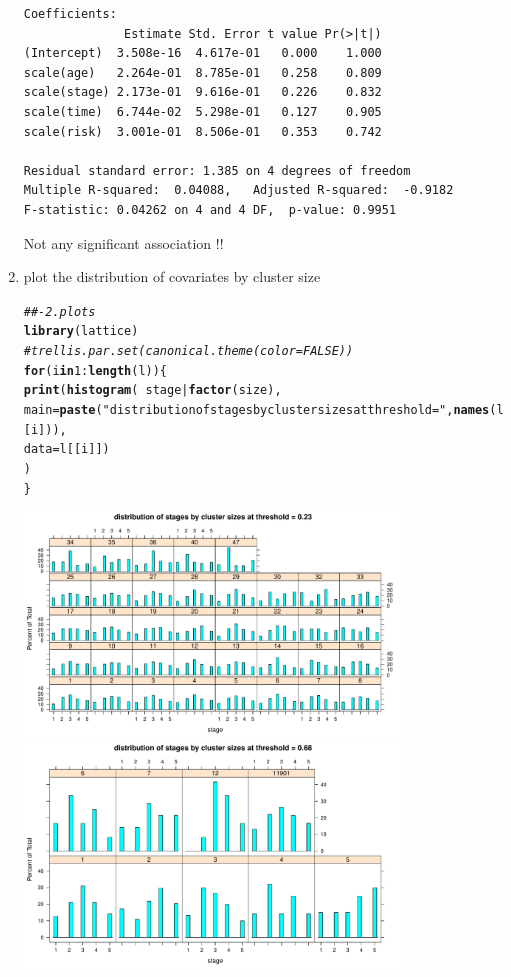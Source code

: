 \documentclass[]{revtex4}\usepackage[]{graphicx}\usepackage[]{color}
\makeatletter
\newcommand{\hlnum}[1]{\textcolor[rgb]{0.686,0.059,0.569}{#1}}%
\newcommand{\hlstr}[1]{\textcolor[rgb]{0.192,0.494,0.8}{#1}}%
\newcommand{\hlcom}[1]{\textcolor[rgb]{0.678,0.584,0.686}{\textit{#1}}}%
\newcommand{\hlopt}[1]{\textcolor[rgb]{0,0,0}{#1}}%
\newcommand{\hlstd}[1]{\textcolor[rgb]{0.345,0.345,0.345}{#1}}%
\newcommand{\hlkwa}[1]{\textcolor[rgb]{0.161,0.373,0.58}{\textbf{#1}}}%
\newcommand{\hlkwc}[1]{\textcolor[rgb]{0.333,0.667,0.333}{#1}}%
\newcommand{\hlkwd}[1]{\textcolor[rgb]{0.737,0.353,0.396}{\textbf{#1}}}%
\newenvironment{kframe}{%
 \def\at@end@of@kframe{}%
 \ifinner\ifhmode%
  \def\at@end@of@kframe{\end{minipage}}%
  \begin{minipage}{\columnwidth}%
 \fi\fi%
 \def\FrameCommand##1{\hskip\@totalleftmargin \hskip-\fboxsep
 \colorbox{shadecolor}{##1}\hskip-\fboxsep
     \hskip-\linewidth \hskip-\@totalleftmargin \hskip\columnwidth}%
 \MakeFramed {\advance\hsize-\width
   \@totalleftmargin\z@ \linewidth\hsize
   \@setminipage}}%
 {\par\unskip\endMakeFramed%
 \at@end@of@kframe}
\newenvironment{knitrout}{}{} %
\makeatother
\begin{document}
\begin{enumerate}
\begin{knitrout}
\begin{kframe}
\begin{verbatim}
Coefficients:
              Estimate Std. Error t value Pr(>|t|)
(Intercept)  3.508e-16  4.617e-01   0.000    1.000
scale(age)   2.264e-01  8.785e-01   0.258    0.809
scale(stage) 2.173e-01  9.616e-01   0.226    0.832
scale(time)  6.744e-02  5.298e-01   0.127    0.905
scale(risk)  3.001e-01  8.506e-01   0.353    0.742

Residual standard error: 1.385 on 4 degrees of freedom
Multiple R-squared:  0.04088,	Adjusted R-squared:  -0.9182 
F-statistic: 0.04262 on 4 and 4 DF,  p-value: 0.9951
\end{verbatim}
\end{kframe}
\end{knitrout}
Not any significant association !!

\item plot the distribution of covariates by cluster size

\begin{knitrout}
\color{fgcolor}\begin{kframe}
\begin{alltt}
\hlcom{##- 2. plots}
\hlkwd{library}\hlstd{(lattice)}
\hlcom{# trellis.par.set(canonical.theme(color = FALSE))}
\hlkwa{for}\hlstd{(i} \hlkwa{in} \hlnum{1}\hlopt{:}\hlkwd{length}\hlstd{(l))\{}
  \hlkwd{print}\hlstd{(}\hlkwd{histogram}\hlstd{(}\hlopt{~} \hlstd{stage}\hlopt{|}\hlkwd{factor}\hlstd{(size),}
            \hlkwc{main} \hlstd{=} \hlkwd{paste}\hlstd{(}\hlstr{"distribution of stages by cluster sizes at threshold ="}\hlstd{,} \hlkwd{names}\hlstd{(l[i])),}
            \hlkwc{data} \hlstd{= l[[i]])}
  \hlstd{)}
\hlstd{\}}
\end{alltt}
\end{kframe}

{\centering \includegraphics[width=10cm]{figure/plotlattice-1} 
\includegraphics[width=10cm]{figure/plotlattice-2} 

}
\end{knitrout}
\end{enumerate}
\end{document}
